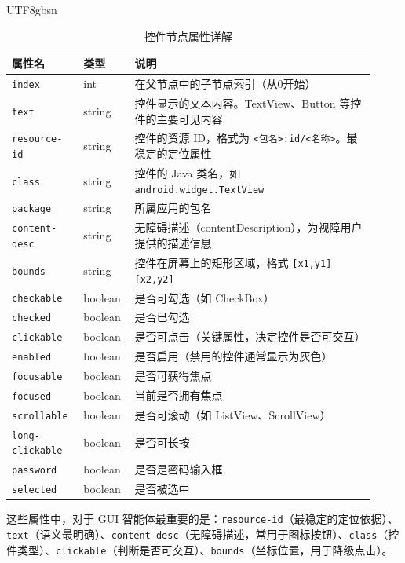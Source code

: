 \documentclass{article}
\begin{document}
\begin{CJK}{UTF8}{gbsn}
\begin{table}[h]
  \centering
  \caption{控件节点属性详解}
  \label{tab:node_attributes}
  \begin{tabular}{p{0.18\linewidth}p{0.12\linewidth}p{0.62\linewidth}}
    \toprule
    属性名 & 类型 & 说明 \\
    \midrule
    \texttt{index} & int & 在父节点中的子节点索引（从0开始）\\
    \texttt{text} & string & 控件显示的文本内容。TextView、Button 等控件的主要可见内容 \\
    \texttt{resource-id} & string & 控件的资源 ID，格式为 \texttt{<包名>:id/<名称>}。最稳定的定位属性 \\
    \texttt{class} & string & 控件的 Java 类名，如 \texttt{android.widget.TextView} \\
    \texttt{package} & string & 所属应用的包名 \\
    \texttt{content-desc} & string & 无障碍描述（contentDescription），为视障用户提供的描述信息 \\
    \texttt{bounds} & string & 控件在屏幕上的矩形区域，格式 \texttt{[x1,y1][x2,y2]} \\
    \midrule
    \texttt{checkable} & boolean & 是否可勾选（如 CheckBox）\\
    \texttt{checked} & boolean & 是否已勾选 \\
    \texttt{clickable} & boolean & 是否可点击（关键属性，决定控件是否可交互）\\
    \texttt{enabled} & boolean & 是否启用（禁用的控件通常显示为灰色）\\
    \texttt{focusable} & boolean & 是否可获得焦点 \\
    \texttt{focused} & boolean & 当前是否拥有焦点 \\
    \texttt{scrollable} & boolean & 是否可滚动（如 ListView、ScrollView）\\
    \texttt{long-clickable} & boolean & 是否可长按 \\
    \texttt{password} & boolean & 是否是密码输入框 \\
    \texttt{selected} & boolean & 是否被选中 \\
    \bottomrule
  \end{tabular}
\end{table}

这些属性中，对于 GUI 智能体最重要的是：\texttt{resource-id}（最稳定的定位依据）、\texttt{text}（语义最明确）、\texttt{content-desc}（无障碍描述，常用于图标按钮）、\texttt{class}（控件类型）、\texttt{clickable}（判断是否可交互）、\texttt{bounds}（坐标位置，用于降级点击）。


\end{CJK}
\end{document}
